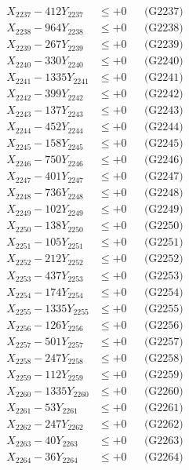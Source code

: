 \documentclass[a4paper,10pt]{article}
\begin{document}
{\begin{align}
X_{2237} - 412Y_{2237} &\leq +0 && \text{(G2237)} \\
X_{2238} - 964Y_{2238} &\leq +0 && \text{(G2238)} \\
X_{2239} - 267Y_{2239} &\leq +0 && \text{(G2239)} \\
X_{2240} - 330Y_{2240} &\leq +0 && \text{(G2240)} \\
\allowbreak
X_{2241} - 1335Y_{2241} &\leq +0 && \text{(G2241)} \\
X_{2242} - 399Y_{2242} &\leq +0 && \text{(G2242)} \\
X_{2243} - 137Y_{2243} &\leq +0 && \text{(G2243)} \\
X_{2244} - 452Y_{2244} &\leq +0 && \text{(G2244)} \\
X_{2245} - 158Y_{2245} &\leq +0 && \text{(G2245)} \\
X_{2246} - 750Y_{2246} &\leq +0 && \text{(G2246)} \\
X_{2247} - 401Y_{2247} &\leq +0 && \text{(G2247)} \\
X_{2248} - 736Y_{2248} &\leq +0 && \text{(G2248)} \\
X_{2249} - 102Y_{2249} &\leq +0 && \text{(G2249)} \\
X_{2250} - 138Y_{2250} &\leq +0 && \text{(G2250)} \\
\allowbreak
X_{2251} - 105Y_{2251} &\leq +0 && \text{(G2251)} \\
X_{2252} - 212Y_{2252} &\leq +0 && \text{(G2252)} \\
X_{2253} - 437Y_{2253} &\leq +0 && \text{(G2253)} \\
X_{2254} - 174Y_{2254} &\leq +0 && \text{(G2254)} \\
X_{2255} - 1335Y_{2255} &\leq +0 && \text{(G2255)} \\
X_{2256} - 126Y_{2256} &\leq +0 && \text{(G2256)} \\
X_{2257} - 501Y_{2257} &\leq +0 && \text{(G2257)} \\
X_{2258} - 247Y_{2258} &\leq +0 && \text{(G2258)} \\
X_{2259} - 112Y_{2259} &\leq +0 && \text{(G2259)} \\
X_{2260} - 1335Y_{2260} &\leq +0 && \text{(G2260)} \\
\allowbreak
X_{2261} - 53Y_{2261} &\leq +0 && \text{(G2261)} \\
X_{2262} - 247Y_{2262} &\leq +0 && \text{(G2262)} \\
X_{2263} - 40Y_{2263} &\leq +0 && \text{(G2263)} \\
X_{2264} - 36Y_{2264} &\leq +0 && \text{(G2264)} \\

\end{align}}
\end{document}
